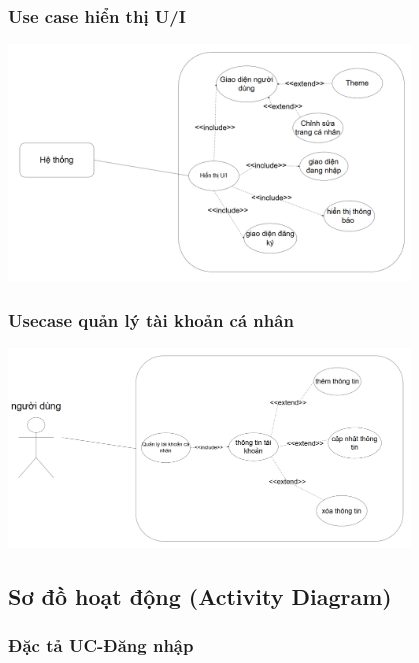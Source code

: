 \documentclass[a4paper,12pt]{article}
\begin{document}
\subsubsection{Use case hiển thị U/I}
\includegraphics[width=0.8\textwidth]{useCaseUI.png}
\subsubsection{Usecase quản lý tài khoản cá nhân}
\includegraphics[width=0.8\textwidth]{useCasecanhan.png}

\subsection{Sơ đồ hoạt động (Activity Diagram)}
\subsubsection{Đặc tả UC-Đăng nhập}
\end{document}
